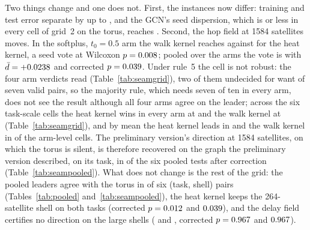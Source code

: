 \documentclass[preprint,11pt,3p]{elsarticle}
\begin{document}
Two things change and one does not. First, the instances now differ: training and test error
separate by up to \numSeamFitMaxGap{}, and the GCN's seed dispersion, which is
\numGthreeGcnSdMax{} or less in every cell of grid~2 on the torus, reaches \numSeamGcnSdMax{}. Second, the
hop field at 1584 satellites moves. In the softplus, $t_{0}=0.5$ arm the walk kernel reaches
\numSeamHopsShellOneWalk{} against \numSeamHopsShellOneHeat{} for the heat kernel, a
\numSeamHopsShellOneWins{} seed vote at Wilcoxon $p=0.008$; pooled over the
\numSeamArms{} arms the vote is \numSeamPooledHopsShellOneWins{} with
$\bar d=+0.0238$ and corrected $p=0.039$. Under rule~5 the cell is not robust: the four arm verdicts read
\numSeamHopsShellOneArmVerdicts{} (Table~\ref{tab:seamgrid}), two of them undecided for want of
seven valid pairs, so the majority rule, which needs seven of ten in every arm, does not see the
result although all four arms agree on the leader; across the six task-scale cells the heat
kernel wins in every arm at \numSeamHeatRobust{} and the walk kernel at \numSeamWalkRobust{}
(Table~\ref{tab:seamgrid}), and by mean the heat kernel leads in \numSeamLeadHeat{} and the walk
kernel in \numSeamLeadWalk{} of the \numSeamArmCells{} arm-level cells. The preliminary version's
direction at 1584 satellites, on which the torus is silent, is therefore recovered on the graph
the preliminary version described, on its task, in \numSeamPooledWalkSig{} of the six pooled
tests after correction (Table~\ref{tab:seampooled}). What does not change is the rest of the
grid: the pooled leaders agree with the torus in \numSeamPooledLeaderAgree{} of six (task, shell)
pairs (Tables~\ref{tab:pooled} and~\ref{tab:seampooled}), the heat kernel keeps the 264-satellite
shell on both tasks (corrected $p=0.012$ and
$0.039$), and the delay field certifies no direction on the large shells
(\numSeamPooledDelayShellOneWins{} and \numSeamPooledDelayDoubleWins{}, corrected
$p=0.967$ and $0.967$).
\end{document}
